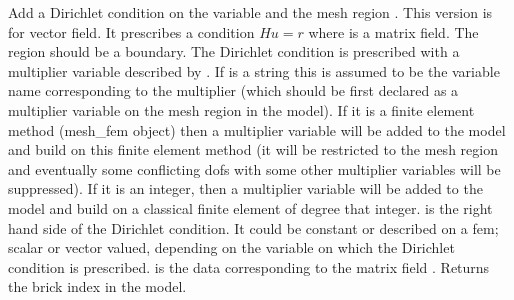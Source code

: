 \documentclass[a4paper,11pt,english]{sphinxmanual}
\begin{document}
\begin{fulllineitems}
\begin{fulllineitems}
\label{\detokenize{python/cmdref_Model:getfem.Model.add_generalized_Dirichlet_condition_with_multipliers}}
Add a Dirichlet condition on the variable  and the mesh
region .  This version is for vector field.
It prescribes a condition \(Hu = r\)
where  is a matrix field. The region should be a boundary. The Dirichlet
condition is prescribed with a multiplier variable described by
. If  is a string this is assumed
to be the variable name corresponding to the multiplier (which should be
first declared as a multiplier variable on the mesh region in the model).
If it is a finite element method (mesh\_fem object) then a multiplier
variable will be added to the model and build on this finite element
method (it will be restricted to the mesh region  and eventually
some conflicting dofs with some other multiplier variables will be
suppressed). If it is an integer, then a  multiplier variable will be
added to the model and build on a classical finite element of degree
that integer.  is the right hand side of  the
Dirichlet condition. It could be constant or described on a fem; scalar
or vector valued, depending on the variable on which the Dirichlet
condition is prescribed.  is the data
corresponding to the matrix field .
Returns the brick index in the model.

\end{fulllineitems}



\end{fulllineitems}
\end{document}
